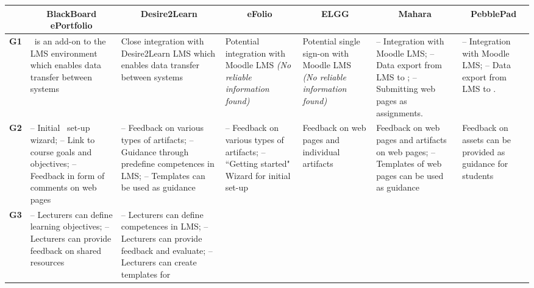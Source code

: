 \begin{sidewaystable} \scriptsize
\centering
	\begin{tabular}{|c|p{3.25cm}|p{3.25cm}|p{3.25cm}|p{3.25cm}|p{3.25cm}|p{3.25cm}|}
	\hline
	 \multicolumn{1}{|c|}{} &
     \multicolumn{1}{c|}{\textbf{BlackBoard ePortfolio}} & 
     \multicolumn{1}{c|}{\textbf{Desire2Learn}} & 
     \multicolumn{1}{c|}{\textbf{eFolio}} & 
     \multicolumn{1}{c|}{\textbf{ELGG}} & 
     \multicolumn{1}{c|}{\textbf{Mahara}} & 
     \multicolumn{1}{c|}{\textbf{PebblePad}} \\ \hline
	\textbf{G1} & 
	\ep~is an add-on to the LMS environment which enables data transfer between
	systems & 
	Close integration with Desire2Learn LMS which enables data transfer between
	systems & 
	Potential integration with Moodle LMS \textit{(No reliable information found)}
	& Potential single sign-on with Moodle LMS \textit{(No reliable information
	found)} & 
	-- Integration with Moodle LMS; \newline -- Data export from LMS to
	\ep; \newline -- Submitting web pages as assignments. &
	-- Integration with Moodle LMS; \newline -- Data export from LMS to
	\ep. \\ \hline 
	\textbf{G2} & 
	-- Initial \ep~set-up wizard; \newline -- Link to course goals and objectives;
	\newline -- Feedback in form of comments on web pages & 
	-- Feedback on various types of artifacts; \newline -- Guidance through
	predefine competences in LMS; \newline -- Templates can be used as guidance &  
	-- Feedback on various types of artifacts; \newline -- ``Getting started"
	Wizard for initial set-up & 
	Feedback on web pages and individual artifacts & 
	Feedback on web pages and artifacts on web pages; \newline -- Templates of web
	pages can be used as guidance & 
	Feedback on assets can be provided as guidance for students \\ \hline 
	\textbf{G3} & 
	-- Lecturers can define learning objectives; \newline -- Lecturers can provide
	feedback on shared resources & 
	-- Lecturers can define competences in LMS; \newline -- Lecturers can
	provide feedback and evaluate; \newline -- Lecturers can create templates for

\end{tabular}
\end{sidewaystable}
